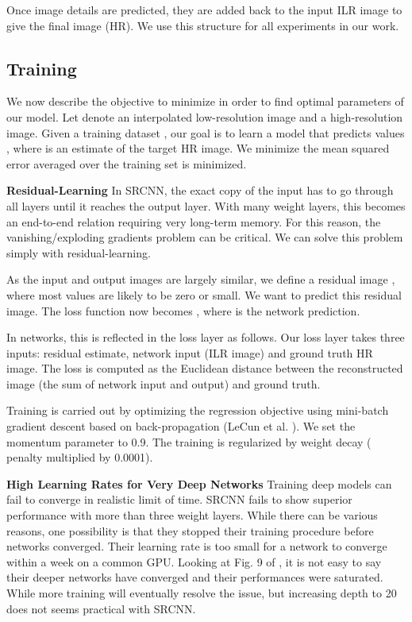 \documentclass[10pt,twocolumn,letterpaper]{article}
\begin{document}
Once image details are predicted, they are added back to the input ILR image to give the final image (HR). We use this structure for all experiments in our work.  


\subsection{Training}

We now describe the objective to minimize in order to find optimal parameters of our model. Let  denote an interpolated low-resolution image and  a high-resolution image. 
Given a training dataset , our goal is to learn a model  that predicts values , where  is an estimate of the target HR image. We minimize the mean squared error 
averaged over the training set is minimized. 

\textbf{Residual-Learning}  In SRCNN, the exact copy of the input has to go through all layers until it reaches the output layer. With many weight layers, this becomes an end-to-end relation requiring very long-term memory. For this reason, the vanishing/exploding gradients problem \cite{bengio1994learning} can be critical. We can solve this problem simply with residual-learning.

As the input and output images are largely similar, we define a residual image , where most values are likely to be zero or small. We want to predict this residual image. The loss function now becomes , where  is the network prediction. 

In networks, this is reflected in the loss layer as follows. 
Our loss layer takes three inputs: residual estimate, network input (ILR image) and ground truth HR image. The loss is computed as the Euclidean distance between the reconstructed image (the sum of network input and output) and ground truth. 

Training is carried out by optimizing the regression objective using mini-batch gradient descent based on back-propagation (LeCun et al. \cite{lecun1998gradient}). We set the momentum parameter to 0.9. The training is regularized by weight decay ( penalty multiplied by
0.0001).  

\textbf{High Learning Rates for Very Deep Networks}
Training deep models can fail to converge in realistic limit of time. SRCNN \cite{dong2015image} fails to show superior performance with more than three weight layers. While there can be various reasons, one possibility is that they stopped their training procedure before networks converged. Their learning rate  is too small for a network to converge within a week on a common GPU. Looking at Fig. 9 of \cite{dong2015image}, it is not easy to say their deeper networks have converged and their performances were saturated. While more training will eventually resolve the issue, but increasing depth to 20 does not seems practical with SRCNN.
\end{document}
